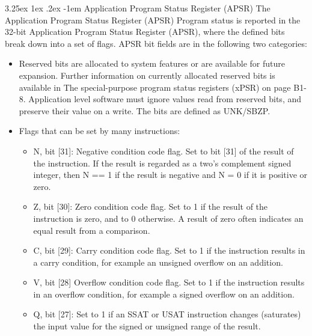 \documentclass[11pt]{report}
\makeatletter
\renewcommand\paragraph{\@startsection{paragraph}{5}{\z@}%
	{3.25ex \@plus1ex \@minus.2ex}%
	{-1em}%
	{\normalfont\normalsize\bfseries}}
\makeatother
\begin{document}
		\paragraph{Application Program Status Register (APSR)} The Application Program Status Register (APSR) Program status is reported in the 32-bit Application Program Status Register (APSR), where the defined bits break down into a set of flags.
		APSR bit fields are in the following two categories:
		\begin{itemize}
			\item Reserved bits are allocated to system features or are available for future expansion. Further information on currently allocated reserved bits is available in The special-purpose program status registers (xPSR) on page B1-8. Application level software must ignore values read from reserved bits, and preserve their value on a write. The bits are defined as UNK/SBZP.
			\item Flags that can be set by many instructions:
			\begin{itemize}
				\item N, bit [31]: Negative condition code flag. Set to bit [31] of the result of the instruction. If the result is regarded as a two's complement signed integer, then N == 1 if the result is negative and N = 0 if it is positive or zero.
				\item Z, bit [30]: Zero condition code flag. Set to 1 if the result of the instruction is zero, and to 0 otherwise.
				A result of zero often indicates an equal result from a comparison.
				\item C, bit [29]: Carry condition code flag. Set to 1 if the instruction results in a carry condition, for
				example an unsigned overflow on an addition.
				\item V, bit [28] Overflow condition code flag. Set to 1 if the instruction results in an overflow condition,		for example a signed overflow on an addition.
				\item Q, bit [27]: Set to 1 if an SSAT or USAT instruction changes (saturates) the input value for the signed or unsigned range of the result.
			\end{itemize}
		\end{itemize}
			
\end{document}
